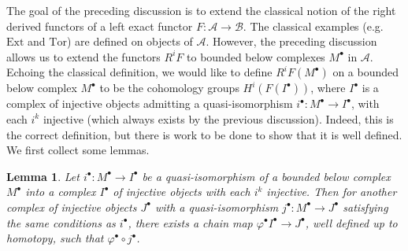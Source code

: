 \documentclass[psamsfonts, 12pt]{amsart}
\newtheorem{lem}[thm]{Lemma}
\theoremstyle{definition}
\theoremstyle{remark}
\begin{document}
The goal of the preceding discussion is to extend the classical notion of
the right derived functors of a left exact functor $F: \mathcal{A} \to \mathcal{B}$.
The classical examples (e.g. $\mathrm{Ext}$ and $\mathrm{Tor}$) are defined
on objects of $\mathcal{A}$. However, the preceding discussion allows us
to extend the functors $R^iF$ to bounded below complexes $M^\bullet$ in $\mathcal{A}$.
Echoing the classical definition, we would like to define $R^iF(M^\bullet)$ on
a bounded below complex $M^\bullet$ to be the cohomology groups $H^i(F(I^\bullet))$,
where $I^\bullet$ is a complex of injective objects admitting a quasi-isomorphism
$i^\bullet : M^\bullet \to I^\bullet$, with each $i^k$ injective (which always exists
by the previous discussion). Indeed, this is the correct definition, but there is work
to be done to show that it is well defined. We first collect some lemmas.
%
\begin{lem}
Let $i^\bullet : M^\bullet \to I^\bullet$
be a quasi-isomorphism of a bounded below complex $M^\bullet$ into a complex $I^\bullet$
of injective objects with each $i^k$ injective. Then for another complex
of injective objects $J^\bullet$ with a quasi-isomorphism
$j^\bullet : M^\bullet \to J^\bullet$ satisfying the same conditions as $i^\bullet$,
there exists a chain map $\varphi^\bullet I^\bullet \to J^\bullet$, well defined up
to homotopy, such that $\varphi^\bullet \circ j^\bullet$.
\end{lem}
%
\newpage
%
\nocite{*}
%
\printbibliography
%
\end{document}
